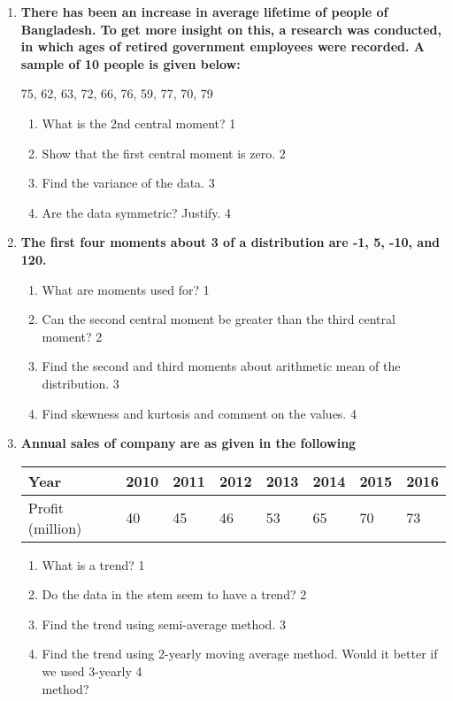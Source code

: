 \documentclass{article}
\begin{document}
\begin{enumerate}
   \item
	  \textbf{There has been an increase in average lifetime of people of Bangladesh. To get more insight on this, a research was conducted, in which ages of retired government employees were recorded. A sample of 10 people is given below:}
	  
	  \begin{center}
	  75, 62, 63, 72, 66, 76, 59, 77, 70, 79
	  \end{center}
    \begin{enumerate}
    \item
	What is the 2nd central moment? \hfill 1
    \item
	Show that the first central moment is zero. \hfill 2
    \item  
	Find the variance of the data. \hfill 3
    \item
	Are the data symmetric? Justify. \hfill 4
  \end{enumerate}
  
   \item
	  \textbf{The first four moments about 3 of a distribution are -1, 5, -10, and 120.} 
  
  \begin{enumerate}
    \item
	What are moments used for? \hfill 1
    \item
	Can the second central moment be greater than the third central moment? \hfill 2
    \item  
	Find the second and third moments about arithmetic mean of the distribution. \hfill 3
    \item
	Find skewness and kurtosis and comment on the values.  \hfill 4
\end{enumerate}

 \item
	  \textbf{Annual sales of company are as given in the following}\
	  
	  \begin{table}[h]
	  \centering
\begin{tabular}{l|l|l|l|l|l|l|l}
Year & 2010 & 2011 & 2012 & 2013 & 2014 & 2015 & 2016 \\ \hline
Profit (million) & 40 & 45 & 46 & 53 & 65 & 70 & 73
\end{tabular}
\end{table}

  \begin{enumerate}
    \item
	What is a trend? \hfill 1
    \item
	Do the data in the stem seem to have a trend? \hfill 2
    \item  
	Find the trend using semi-average method. \hfill 3
    \item
	Find the trend using 2-yearly moving average method. Would it better if we used 3-yearly  \hfill 4 \\  method?
\end{enumerate}
  
\end{enumerate}
\end{document}
